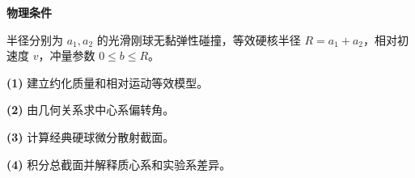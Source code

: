 \textbf{物理条件}\par 半径分别为 \(a_1,a_2\) 的光滑刚球无黏弹性碰撞，等效硬核半径 \(R=a_1+a_2\)，相对初速度 \(v\)，冲量参数 \(0\le b\le R\)。
\par\noindent\textbf{(1)} 建立约化质量和相对运动等效模型。
\par\noindent\textbf{(2)} 由几何关系求中心系偏转角。
\par\noindent\textbf{(3)} 计算经典硬球微分散射截面。
\par\noindent\textbf{(4)} 积分总截面并解释质心系和实验系差异。
